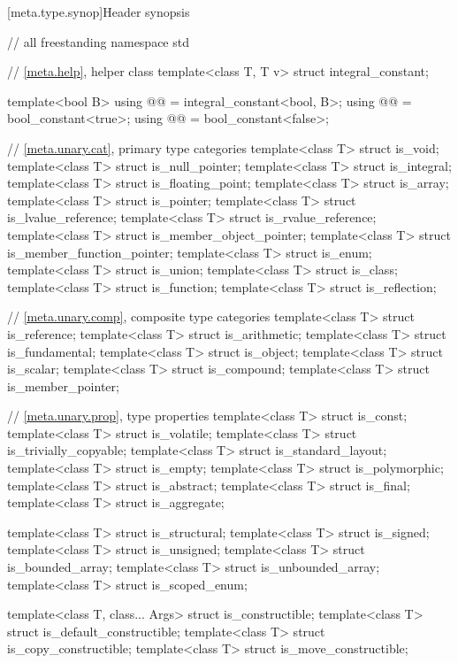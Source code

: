 [meta.type.synop]{Header  synopsis}

%
\begin{codeblock}
// all freestanding
namespace std {
  // \ref{meta.help}, helper class
  template<class T, T v> struct integral_constant;

  template<bool B>
    using @@ = integral_constant<bool, B>;
  using @@  = bool_constant<true>;
  using @@ = bool_constant<false>;

  // \ref{meta.unary.cat}, primary type categories
  template<class T> struct is_void;
  template<class T> struct is_null_pointer;
  template<class T> struct is_integral;
  template<class T> struct is_floating_point;
  template<class T> struct is_array;
  template<class T> struct is_pointer;
  template<class T> struct is_lvalue_reference;
  template<class T> struct is_rvalue_reference;
  template<class T> struct is_member_object_pointer;
  template<class T> struct is_member_function_pointer;
  template<class T> struct is_enum;
  template<class T> struct is_union;
  template<class T> struct is_class;
  template<class T> struct is_function;
  template<class T> struct is_reflection;

  // \ref{meta.unary.comp}, composite type categories
  template<class T> struct is_reference;
  template<class T> struct is_arithmetic;
  template<class T> struct is_fundamental;
  template<class T> struct is_object;
  template<class T> struct is_scalar;
  template<class T> struct is_compound;
  template<class T> struct is_member_pointer;

  // \ref{meta.unary.prop}, type properties
  template<class T> struct is_const;
  template<class T> struct is_volatile;
  template<class T> struct is_trivially_copyable;
  template<class T> struct is_standard_layout;
  template<class T> struct is_empty;
  template<class T> struct is_polymorphic;
  template<class T> struct is_abstract;
  template<class T> struct is_final;
  template<class T> struct is_aggregate;

  template<class T> struct is_structural;
  template<class T> struct is_signed;
  template<class T> struct is_unsigned;
  template<class T> struct is_bounded_array;
  template<class T> struct is_unbounded_array;
  template<class T> struct is_scoped_enum;

  template<class T, class... Args> struct is_constructible;
  template<class T> struct is_default_constructible;
  template<class T> struct is_copy_constructible;
  template<class T> struct is_move_constructible;

}
\end{codeblock}

